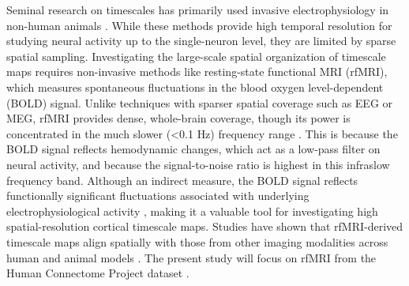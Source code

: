 \documentclass[9pt]{article}
\begin{document}
Seminal research on timescales has primarily used invasive electrophysiology in non-human animals \citep{murray_hierarchy_2014, cirillo_neural_2018, nougaret_intrinsic_2021, manea_intrinsic_2022, spitmaan_multiple_2020, trepka_training-dependent_2024}. While these methods provide high temporal resolution for studying neural activity up to the single-neuron level, they are limited by sparse spatial sampling. Investigating the large-scale spatial organization of timescale maps requires non-invasive methods like resting-state functional MRI (rfMRI), which measures spontaneous fluctuations in the blood oxygen level-dependent (BOLD) signal. Unlike techniques with sparser spatial coverage such as EEG or MEG, rfMRI provides dense, whole-brain coverage, though its power is concentrated in the much slower (<0.1 Hz) frequency range \citep{raut_hierarchical_2020, he_scale-free_2011}. This is because the BOLD signal reflects hemodynamic changes, which act as a low-pass filter on neural activity, and because the signal-to-noise ratio is highest in this infraslow frequency band. Although an indirect measure, the BOLD signal reflects functionally significant fluctuations associated with underlying electrophysiological activity \citep{logothetis_what_2008}, making it a valuable tool for investigating high spatial-resolution cortical timescale maps. Studies have shown that rfMRI-derived timescale maps align spatially with those from other imaging modalities across human and animal models \citep{raut_hierarchical_2020, shafiei_topographic_2020, lurie_cortical_2024}. The present study will focus on rfMRI from the Human Connectome Project dataset \citep{van_essen_wu-minn_2013}.
\end{document}
